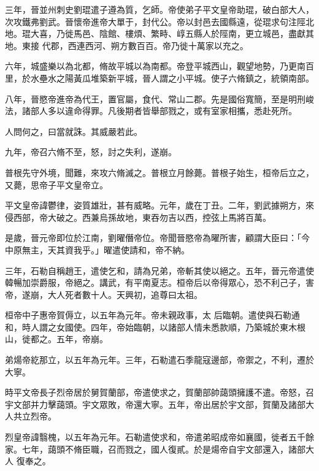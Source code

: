 \begin{pinyinscope}
 三年，晉並州刺史劉琨遣子遵為質，乞師。帝使弟子平文皇帝助琨，破白部大人，次攻鐵弗劉武。晉懷帝進帝大單于，封代公。帝以封邑去國縣遠，從琨求句注陘北地。琨大喜，乃徙馬邑、陰館、樓煩、繁畤、崞五縣人於陘南，更立城邑，盡獻其地。東接
 代郡，西連西河、朔方數百百。帝乃徙十萬家以充之。



 六年，城盛樂以為北都，脩故平城以為南都。帝登平城西山，觀望地勢，乃更南百里，於水壘水之陽黃瓜堆築新平城，晉人謂之小平城。使子六脩鎮之，統領南部。



 八年，晉愍帝進帝為代王，置官屬，食代、常山二郡。先是國俗寬簡，至是明刑峻法，諸部人多以違命得罪。凡後期者皆舉部戮之，或有室家相攜，悉赴死所。



 人問何之，曰當就誅。其威嚴若此。



 九年，帝召六脩不至，怒，討之失利，遂崩。



 普根先守外境，聞難，來攻六脩滅之。普根立月餘薨。普根子始生，桓帝后立之，又薨，思帝子平文皇帝立。



 平文皇帝諱鬱律，姿質雄壯，甚有威略。元年，歲在丁丑。二年，劉武據朔方，來侵西部，帝大破之。西兼烏孫故地，東吞勿吉以西，控弦上馬將百萬。



 是歲，晉元帝即位於江南，劉曜僭帝位。帝聞晉愍帝為曜所害，顧謂大臣曰：「今中原無主，天其資我乎。」曜遣使請和，帝不納。



 三年，石勒自稱趙王，遣使乞和，請為兄弟，帝斬其使以絕之。五年，晉元帝遣使韓暢加崇爵服，帝絕之。講武，有平南夏志。桓帝后以帝得眾心，恐不利己子，害帝，遂崩，大人死者數十人。天興初，追尊曰太祖。



 桓帝中子惠帝賀傉立，以五年為元年。帝未親政事，太
 后臨朝。遣使與石勒通和，時人謂之女國使。四年，帝始臨朝，以諸部人情未悉款順，乃築城於東木根山，徙都之。五年，帝崩。



 弟煬帝紇那立，以五年為元年。三年，石勒遣石季龍寇邊部，帝禦之，不利，遷於大寧。



 時平文帝長子烈帝居於舅賀蘭部，帝遣使求之，賀蘭部帥藹頭擁護不遣。帝怒，召宇文部并力擊藹頭。宇文眾敗，帝還大寧。五年，帝出居於宇文部，賀蘭及諸部大人共立烈帝。



 烈皇帝諱翳槐，以五年為元年。石勒遣使求和，帝遣弟昭成帝如襄國，徙者五千餘家。七年，藹頭不脩臣職，召而戮之，國人復貳。於是煬帝自宇文部還入，諸部大人
 復奉之。




\end{pinyinscope}
